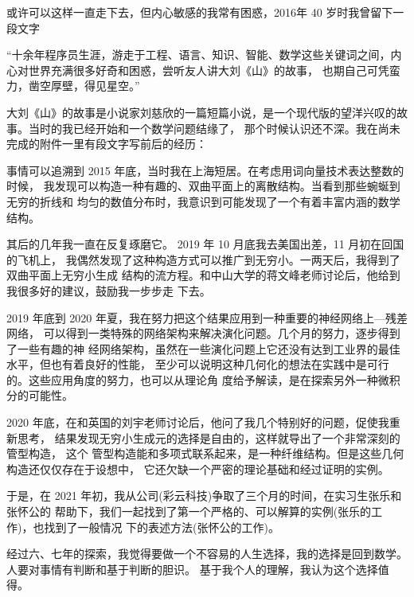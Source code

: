 \documentclass[a4paper,12pt]{article}
\numberwithin{problem}{section}
\numberwithin{definition}{section}
\numberwithin{lemma}{section}
\numberwithin{proposition}{section}
\numberwithin{theorem}{section}
\numberwithin{grammar}{section}
\numberwithin{program}{section}
\numberwithin{convention}{section}
\numberwithin{corollary}{section}
\begin{document}
或许可以这样一直走下去，但内心敏感的我常有困惑，2016年 40 岁时我曾留下一段文字

\begin{displayquote}
“十余年程序员生涯，游走于工程、语言、知识、智能、数学这些关键词之间，内心对世界充满很多好奇和困惑，尝听友人讲大刘《山》的故事，
也期自己可凭蛮力，凿空厚壁，得见星空。”
\end{displayquote}

大刘《山》的故事是小说家刘慈欣的一篇短篇小说，是一个现代版的望洋兴叹的故事。当时的我已经开始和一个数学问题结缘了，
那个时候认识还不深。我在尚未完成的附件一里有段文字写前后的经历：

\begin{displayquote}
    事情可以追溯到 2015 年底，当时我在上海短居。在考虑用词向量技术表达整数的时候，
    我发现可以构造一种有趣的、双曲平面上的离散结构。当看到那些蜿蜒到无穷的折线和
    均匀的数值分布时，我意识到可能发现了一个有着丰富内涵的数学结构。

    其后的几年我一直在反复琢磨它。 2019 年 10 月底我去美国出差，11 月初在回国的飞机上，
    我偶然发现了这种构造方式可以推广到无穷小。一两天后，我得到了双曲平面上无穷小生成
    结构的流方程。和中山大学的蒋文峰老师讨论后，他给到我很多好的建议，鼓励我一步步走
    下去。

    2019 年底到 2020 年夏，我在努力把这个结果应用到一种重要的神经网络上—残差网络，
    可以得到一类特殊的网络架构来解决演化问题。几个月的努力，逐步得到了一些有趣的神
    经网络架构，虽然在一些演化问题上它还没有达到工业界的最佳水平，但也有着良好的性能，
    至少可以说明这种几何化的想法在实践中是可行的。这些应用角度的努力，也可以从理论角
    度给予解读，是在探索另外一种微积分的可能性。

    2020 年底，在和英国的刘宇老师讨论后，他问了我几个特别好的问题，促使我重新思考，
    结果发现无穷小生成元的选择是自由的，这样就导出了一个非常深刻的管型构造， 这个
    管型构造能和多项式联系起来，是一种纤维结构。但是这些几何构造还仅仅存在于设想中，
    它还欠缺一个严密的理论基础和经过证明的实例。

    于是，在 2021 年初，我从公司(彩云科技)争取了三个月的时间，在实习生张乐和张怀公的
    帮助下，我们一起找到了第一个严格的、可以解算的实例(张乐的工作)，也找到了一般情况
    下的表述方法(张怀公的工作)。
\end{displayquote}

经过六、七年的探索，我觉得要做一个不容易的人生选择，我的选择是回到数学。人要对事情有判断和基于判断的胆识。
基于我个人的理解，我认为这个选择值得。

\newpage
\end{document}
